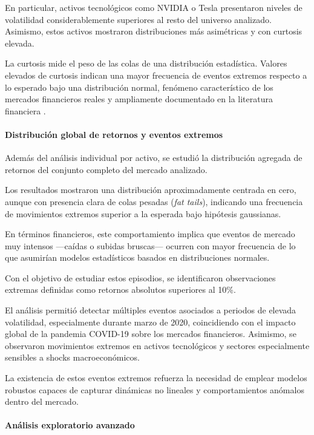\documentclass[
]{article}
\begin{document}
En particular, activos tecnológicos como NVIDIA o Tesla presentaron niveles de volatilidad considerablemente superiores al resto del universo analizado. Asimismo, estos activos mostraron distribuciones más asimétricas y con curtosis elevada.

La curtosis mide el peso de las colas de una distribución estadística. Valores elevados de curtosis indican una mayor frecuencia de eventos extremos respecto a lo esperado bajo una distribución normal, fenómeno característico de los mercados financieros reales y ampliamente documentado en la literatura financiera \parencite{cont2001empirical}.

\paragraph{Distribución global de retornos y eventos extremos}

Además del análisis individual por activo, se estudió la distribución agregada de retornos del conjunto completo del mercado analizado.

Los resultados mostraron una distribución aproximadamente centrada en cero, aunque con presencia clara de colas pesadas (\textit{fat tails}), indicando una frecuencia de movimientos extremos superior a la esperada bajo hipótesis gaussianas.

En términos financieros, este comportamiento implica que eventos de mercado muy intensos —caídas o subidas bruscas— ocurren con mayor frecuencia de lo que asumirían modelos estadísticos basados en distribuciones normales.

Con el objetivo de estudiar estos episodios, se identificaron observaciones extremas definidas como retornos absolutos superiores al 10\%.

El análisis permitió detectar múltiples eventos asociados a periodos de elevada volatilidad, especialmente durante marzo de 2020, coincidiendo con el impacto global de la pandemia COVID-19 sobre los mercados financieros. Asimismo, se observaron movimientos extremos en activos tecnológicos y sectores especialmente sensibles a shocks macroeconómicos.

La existencia de estos eventos extremos refuerza la necesidad de emplear modelos robustos capaces de capturar dinámicas no lineales y comportamientos anómalos dentro del mercado.

\paragraph{Análisis exploratorio avanzado}
\end{document}

